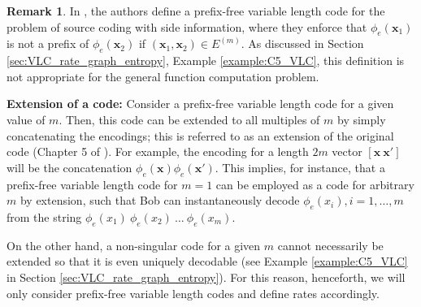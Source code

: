 \documentclass[journal, onecolumn, draftcls]{IEEEtran}
\theoremstyle{definition}
\newtheorem{remark}{Remark}
\newcommand{\bfx}{\mathbf{x}}
\newcommand{\aditya}[1]{\marginpar{+}{\bf Aditya's remark}: {\em #1}}
\begin{document}
\begin{remark}\label{remark:AlonO_prefix-free}
In \cite{AlonO_96}, the authors define a prefix-free variable length code for the problem of source coding with side information, where they enforce that $\phi_e(\bfx_1)$ is not a prefix of $\phi_e(\bfx_2)$ if $(\bfx_1, \bfx_2) \in E^{(m)}$. As discussed in Section \ref{sec:VLC_rate_graph_entropy}, Example \ref{example:C5_VLC}, this definition is not appropriate for the general function computation problem.
%
\end{remark} 


\textbf{Extension of a code:} Consider a prefix-free variable length code for a given value of $m$. Then, this code can be extended to all multiples of $m$ by simply concatenating the encodings; this is referred to as an extension of the original code (Chapter 5 of \cite{CoverT05}). For example, the encoding for a length $2m$ vector $[\bfx~ \bfx']$ will be the concatenation $\phi_e(\bfx)\phi_e(\bfx')$. This implies, for instance, that a prefix-free variable length code for $m=1$ can be employed as a code for arbitrary $m$ by extension, such that Bob can instantaneously decode $\phi_e(x_i), i = 1, \dots, m$ from the string $\phi_e(x_1)~\phi_e(x_2)~\dots~\phi_e(x_m)$.

On the other hand, a non-singular code for a given $m$ cannot necessarily be extended so that it is even uniquely decodable \cite{CoverT05} (see Example \ref{example:C5_VLC} in Section \ref{sec:VLC_rate_graph_entropy}). For this reason, henceforth, we will only consider prefix-free variable length codes and define rates accordingly.




\end{document}
